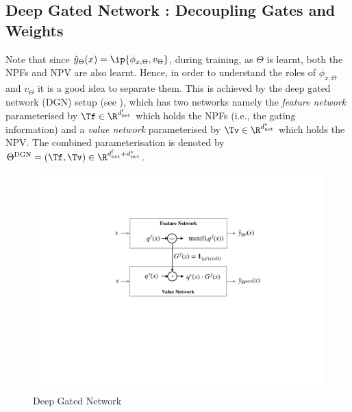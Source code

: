 \subsection{Deep Gated Network : Decoupling Gates and Weights}\label{sec:dgn}
Note that since $\hat{y}_{\Theta}(x)=\ip{\phi_{x,\Theta},v_{\Theta}}$, during training, as $\Theta$ is learnt, both the NPFs and NPV are also learnt. Hence, in order to understand the roles of $\phi_{x,\Theta}$ and $v_{\Theta}$ it is a good idea to separate them. This is achieved by the deep gated network (DGN) setup (see ), which has two networks namely the \emph{feature network} parameterised by $\Tf\in\R^{d^{\text{f}}_{\text{net}}}$ which holds the NPFs (i.e., the gating information) and a \emph{value network} parameterised by $\Tv\in\R^{d^{\text{v}}_{\text{net}}}$ which holds the NPV.  The combined parameterisation is denoted by $\Theta^{\text{DGN}}=(\Tf,\Tv)\in \R^{d^{\text{f}}_{\text{net}}+d^{\text{v}}_{\text{net}}}$.  
\FloatBarrier
\begin{figure}[h]
\centering
\includegraphics[scale=0.25]{figs/dgn-nips.pdf}
\caption{Deep Gated Network }
\label{fig:dgn}
\end{figure}
